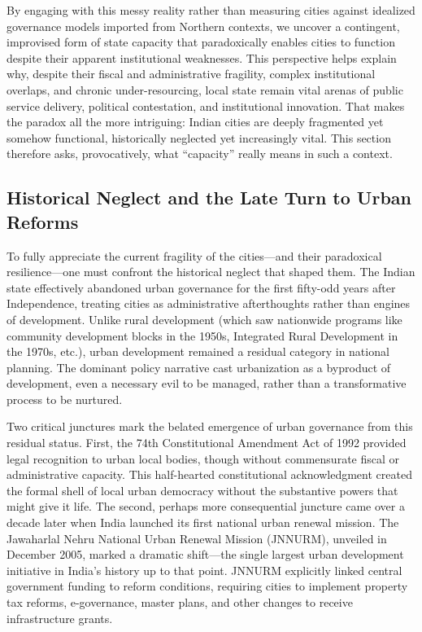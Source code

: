 By engaging with this messy reality rather than measuring cities against idealized governance models imported from Northern contexts, we uncover a contingent, improvised form of state capacity that paradoxically enables cities to function despite their apparent institutional weaknesses. This perspective helps explain why, despite their fiscal and administrative fragility, complex institutional overlaps, and chronic under-resourcing, local state remain vital arenas of public service delivery, political contestation, and institutional innovation. That makes the paradox all the more intriguing: Indian cities are deeply fragmented yet somehow functional, historically neglected yet increasingly vital. This section therefore asks, provocatively, what ``capacity'' really means in such a context.

\subsection{Historical Neglect and the Late Turn to Urban Reforms}

To fully appreciate the current fragility of the cities—and their paradoxical resilience—one must confront the historical neglect that shaped them. The Indian state effectively abandoned urban governance for the first fifty-odd years after Independence, treating cities as administrative afterthoughts rather than engines of development. Unlike rural development (which saw nationwide programs like community development blocks in the 1950s, Integrated Rural Development in the 1970s, etc.), urban development remained a residual category in national planning. The dominant policy narrative cast urbanization as a byproduct of development, even a necessary evil to be managed, rather than a transformative process to be nurtured.

Two critical junctures mark the belated emergence of urban governance from this residual status. First, the 74th Constitutional Amendment Act of 1992 provided legal recognition to urban local bodies, though without commensurate fiscal or administrative capacity. This half-hearted constitutional acknowledgment created the formal shell of local urban democracy without the substantive powers that might give it life. The second, perhaps more consequential juncture came over a decade later when India launched its first national urban renewal mission. The Jawaharlal Nehru National Urban Renewal Mission (JNNURM), unveiled in December 2005, marked a dramatic shift—the single largest urban development initiative in India's history up to that point. JNNURM explicitly linked central government funding to reform conditions, requiring cities to implement property tax reforms, e-governance, master plans, and other changes to receive infrastructure grants.

